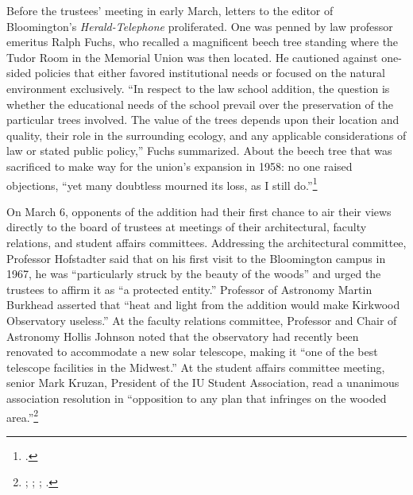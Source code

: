 \documentclass[
  american,
  letterpaper,
]{scrreprt}
\begin{document}
Before the trustees' meeting in early March, letters to the editor of
Bloomington's \emph{Herald-Telephone} proliferated. One was penned by
law professor emeritus Ralph Fuchs, who recalled a magnificent beech
tree standing where the Tudor Room in the Memorial Union was then
located. He cautioned against one-sided policies that either favored
institutional needs or focused on the natural environment exclusively.
``In respect to the law school addition, the question is whether the
educational needs of the school prevail over the preservation of the
particular trees involved. The value of the trees depends upon their
location and quality, their role in the surrounding ecology, and any
applicable considerations of law or stated public policy,'' Fuchs
summarized. About the beech tree that was sacrificed to make way for the
union's expansion in 1958: no one raised objections, ``yet many
doubtless mourned its loss, as I still do.''\footnote{.}

On March 6, opponents of the addition had their first chance to air
their views directly to the board of trustees at meetings of their
architectural, faculty relations, and student affairs committees.
Addressing the architectural committee, Professor Hofstadter said that
on his first visit to the Bloomington campus in 1967, he was
``particularly struck by the beauty of the woods'' and urged the
trustees to affirm it as ``a protected entity.'' Professor of Astronomy
Martin Burkhead asserted that ``heat and light from the addition would
make Kirkwood Observatory useless.'' At the faculty relations committee,
Professor and Chair of Astronomy Hollis Johnson noted that the
observatory had recently been renovated to accommodate a new solar
telescope, making it ``one of the best telescope facilities in the
Midwest.'' At the student affairs committee meeting, senior Mark Kruzan,
President of the IU Student Association, read a unanimous association
resolution in ``opposition to any plan that infringes on the wooded
area.''\footnote{;
  ; ; .}
\end{document}
